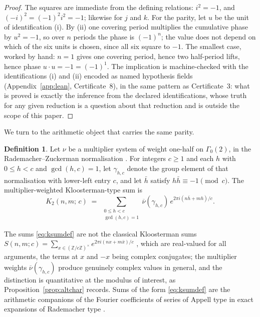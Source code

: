 \documentclass[11pt,a4paper]{article}
\newcommand{\Z}{\mathbb{Z}}
\theoremstyle{plain}
\theoremstyle{definition}
\newtheorem{definition}[theorem]{Definition}
\theoremstyle{remark}
\begin{document}
\begin{proof}
The squares are immediate from the defining relations: $i^2 = -1$, and $(-i)^2 = (-1)^2 i^2 = -1$; likewise for $j$ and $k$. For the parity, let $u$ be the unit of identification (i). By (ii) one covering period multiplies the cumulative phase by $u^2 = -1$, so over $n$ periods the phase is $(-1)^n$; the value does not depend on which of the six units is chosen, since all six square to $-1$. The smallest case, worked by hand: $n = 1$ gives one covering period, hence two half-period lifts, hence phase $u \cdot u = -1 = (-1)^1$. The implication is machine-checked with the identifications (i) and (ii) encoded as named hypothesis fields (Appendix~\ref{app:lean}, Certificate~8), in the same pattern as Certificate~3: what is proved is exactly the inference from the declared identifications, whose truth for any given reduction is a question about that reduction and is outside the scope of this paper.
\end{proof}

We turn to the arithmetic object that carries the same parity.

\begin{definition}\label{def:ksum}
Let $\nu$ be a multiplier system of weight one-half on $\Gamma_0(2)$, in the Rademacher--Zuckerman normalisation \cite{RademacherZuckerman}. For integers $c \ge 1$ and each $h$ with $0 \le h < c$ and $\gcd(h,c) = 1$, let $\gamma_{h,c}$ denote the group element of that normalisation with lower-left entry $c$, and let $\bar h$ satisfy $h\bar h \equiv -1 \pmod c$. The multiplier-weighted Kloosterman-type sum is
\begin{equation}\label{eq:ksumdef}
K_2(n, m;\, c) \;=\;
\sum_{\substack{0 \le h < c \\ \gcd(h,c)=1}}
\overline{\nu}(\gamma_{h,c})\,
e^{2\pi i (n \bar h + m h)/c} .
\end{equation}
\end{definition}

The sums \eqref{eq:ksumdef} are not the classical Kloosterman sums $S(n,m;c) = \sum_{x \in (\Z/c\Z)^{\times}} e^{2\pi i (nx + m\bar x)/c}$ \cite{Kloosterman}, which are real-valued for all arguments, the terms at $x$ and $-x$ being complex conjugates; the multiplier weights $\overline{\nu}(\gamma_{h,c})$ produce genuinely complex values in general, and the distinction is quantitative at the modulus of interest, as Proposition~\ref{prop:altchar} records. Sums of the form \eqref{eq:ksumdef} are the arithmetic companions of the Fourier coefficients of series of Appell type in exact expansions of Rademacher type \cite{RademacherZuckerman, BringmannOno}.
\end{document}

